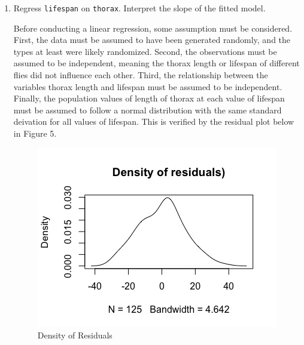 \documentclass[12pt,letterpaper]{article}
\begin{document}
\begin{enumerate}
	 	
	
	\vspace{.5cm}
	

	\item
	Regress \texttt{lifespan} on \texttt{thorax}.  Interpret the slope of the fitted model.

	\vspace{.5cm}
	
	Before conducting a linear regression, some assumption must be considered. First, the data must be assumed to have been generated randomly, and the types at least were likely randomized. Second, the observations must be assumed to be independent, meaning the thorax length or lifespan of different flies did not influence each other. Third, the relationship between the variables thorax length and lifespan must be assumed to be independent. Finally, the population values of length of thorax at each value of lifespan must be assumed to follow a normal distribution with the same standard deivation for all values of lifespan. This is verified by the residual plot below in Figure 5.
	
	 
	
	\begin{figure}[h!]
		\caption{\footnotesize{Density of Residuals}}
		\vspace{.5cm}
		\centering
		\label{fig:density_resid3}
		\includegraphics[width=1\textwidth]{./PS2_Graph_4.png}
	\end{figure}	
	

\end{enumerate}
\end{document}
